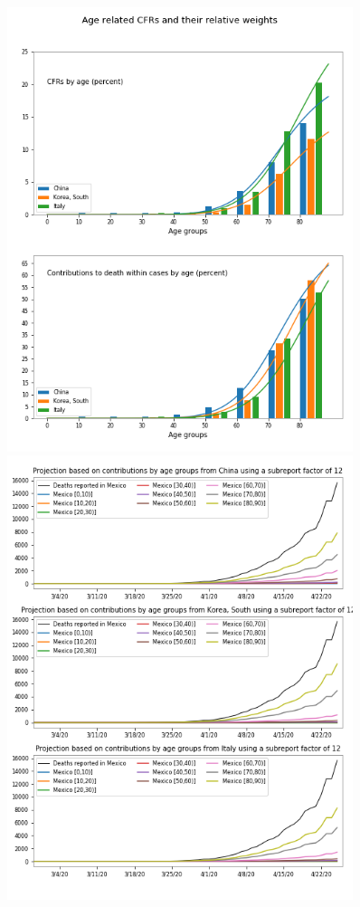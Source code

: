 \documentclass[8pt]{article}
\begin{document}
\begin{figure}[h]
\centering
\begin{minipage}{0.5\textwidth}
\includegraphics[width=0.9\textwidth]{../figures_COVID19_dataAnalysis/dam_COVID19_JHU_cfr+propDeathCases_ByAge_China+SKorea+Italy_OneFigure.png}
\end{minipage}%
\begin{minipage}{0.5\textwidth}
\includegraphics[width=0.9\textwidth] {../figures_COVID19_dataAnalysis/dam_COVID19_JHU_cfr+propDeathCasesByAgeTS_EstimatesMexico_subReportFactor12.png}

\end{minipage}
\end{figure}
\end{document}
